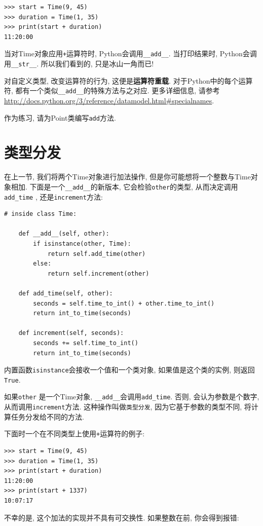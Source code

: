 \documentclass[10pt]{book}
\begin{document}
\begin{verbatim}
>>> start = Time(9, 45)
>>> duration = Time(1, 35)
>>> print(start + duration)
11:20:00
\end{verbatim}
%
当对Time对象应用{\tt +}运算符时, Python会调用\verb"__add__".
当打印结果时, Python会调用\verb"__str__".
所以我们看到的, 只是冰山一角而已!

对自定义类型, 改变运算符的行为, 这便是{\bf 运算符重载}. 
对于Python中的每个运算符, 都有一个类似\verb"__add__"的特殊方法与之对应. 
更多详细信息, 请参考
\url{http://docs.python.org/3/reference/datamodel.html#specialnames}.

作为练习, 请为Point类编写{\tt add}方法. 

\section{类型分发}

在上一节, 我们将两个Time对象进行加法操作, 
但是你可能想将一个整数与Time对象相加. 
下面是一个\verb"__add__"的新版本, 它会检验{\tt other}的类型, 
从而决定调用\verb"add_time" , 还是{\tt increment}方法:

\begin{verbatim}
# inside class Time:

    def __add__(self, other):
        if isinstance(other, Time):
            return self.add_time(other)
        else:
            return self.increment(other)

    def add_time(self, other):
        seconds = self.time_to_int() + other.time_to_int()
        return int_to_time(seconds)

    def increment(self, seconds):
        seconds += self.time_to_int()
        return int_to_time(seconds)
\end{verbatim}
%
内置函数{\tt isinstance}会接收一个值和一个类对象, 
如果值是这个类的实例, 则返回{\tt True}.

如果{\tt other} 是一个Time对象, 
\verb"__add__"会调用\verb"add_time". 
否则, 会认为参数是个数字, 从而调用{\tt increment}方法. 
这种操作叫做{\tt 类型分发}, 因为它基于参数的类型不同, 
将计算任务分发给不同的方法. 

下面时一个在不同类型上使用{\tt +}运算符的例子:

\begin{verbatim}
>>> start = Time(9, 45)
>>> duration = Time(1, 35)
>>> print(start + duration)
11:20:00
>>> print(start + 1337)
10:07:17
\end{verbatim}
%
不幸的是, 这个加法的实现并不具有可交换性. 
如果整数在前, 你会得到报错:
\end{document}
